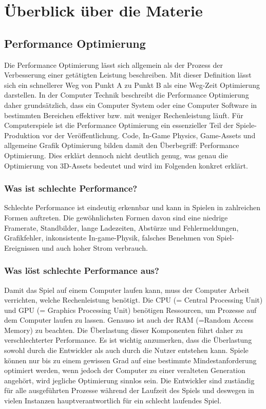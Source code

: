 \chapter{Überblick über die Materie}

\section{Performance Optimierung}

Die Performance Optimierung lässt sich allgemein als der Prozess der Verbesserung einer getätigten Leistung beschreiben. Mit dieser Definition lässt sich ein schnellerer Weg von Punkt A zu Punkt B als eine Weg-Zeit Optimierung darstellen. In der Computer Technik beschreibt die Performance Optimierung daher grundsätzlich, dass ein Computer System oder eine Computer Software in bestimmten Bereichen effektiver bzw. mit weniger Rechenleistung läuft. Für Computerspiele ist die Performance Optimierung ein essenzieller Teil der Spiele-Produktion vor der Veröffentlichung. Code, In-Game Physics, Game-Assets und allgemeine Grafik Optimierung bilden damit den Überbegriff: Performance Optimierung. Dies erklärt dennoch nicht deutlich genug, was genau die Optimierung von 3D-Assets bedeutet und wird im Folgenden konkret erklärt.\cite[648]{_advances}

\subsection{Was ist schlechte Performance?}

Schlechte Performance ist eindeutig erkennbar und kann in Spielen in zahlreichen Formen auftreten. Die gewöhnlichsten Formen davon sind eine niedrige Framerate, Standbilder, lange Ladezeiten, Abstürze und Fehlermeldungen, Grafikfehler, inkonsistente In-game-Physik, falsches Benehmen von Spiel-Ereignissen und auch hoher Strom verbrauch.

\subsection{Was löst schlechte Performance aus?}

Damit das Spiel auf einem Computer laufen kann, muss der Computer Arbeit verrichten, welche Rechenleistung benötigt. Die CPU (= Central Processing Unit) und GPU (= Graphics Processing Unit) benötigen Ressourcen, um Prozesse auf dem Computer laufen zu lassen. Genauso ist auch der RAM (=Random Access Memory) zu beachten. Die Überlastung dieser Komponenten führt daher zu verschlechterter Performance. Es ist wichtig anzumerken, dass die Überlastung sowohl durch die Entwickler als auch durch die Nutzer entstehen kann. Spiele können nur bis zu einem gewissen Grad auf eine bestimmte Mindestanforderung optimiert werden, wenn jedoch der Computer zu einer veralteten Generation angehört, wird jegliche Optimierung sinnlos sein. Die Entwickler sind zuständig für alle ausgeführten Prozesse während der Laufzeit des Spiels und deswegen in vielen Instanzen hauptverantwortlich für ein schlecht laufendes Spiel.

